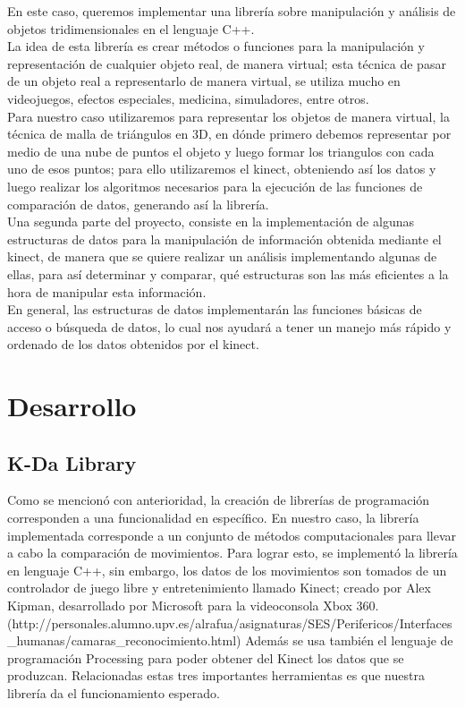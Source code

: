 \documentclass[letterpaper]{article}
\begin{document}
En este caso, queremos implementar una librería sobre manipulación y análisis de objetos tridimensionales
en el lenguaje C++.\\

La idea  de esta librería es crear métodos o funciones para la manipulación y representación 
de cualquier objeto real, de manera virtual; esta técnica de pasar de un objeto real a representarlo de manera virtual, se utiliza mucho 
en videojuegos, efectos especiales, medicina, simuladores, entre otros.\\

Para nuestro caso utilizaremos para representar los objetos de manera virtual, la técnica de malla de triángulos en 3D, en dónde primero debemos 
representar por medio de una nube de puntos el objeto y luego formar los triangulos con cada uno de esos puntos; para ello utilizaremos el kinect, 
obteniendo así los datos y luego realizar los algoritmos necesarios para la ejecución de las funciones de comparación de datos, generando así la librería.\\


Una segunda parte del proyecto, consiste en la implementación de algunas estructuras de datos para la manipulación de información obtenida mediante el kinect, de manera que se quiere realizar un análisis implementando algunas de ellas, para así determinar y comparar, qué estructuras son las más eficientes a la hora de manipular esta información.\\

En general, las estructuras de datos implementarán las funciones básicas de acceso o búsqueda de datos, lo cual nos ayudará a tener un manejo más rápido y ordenado de los datos obtenidos por el kinect.

 

\section{Desarrollo}

\subsection{K-Da Library}

Como se mencionó con anterioridad, la creación de librerías de programación corresponden a una funcionalidad en específico. En nuestro caso, la librería
implementada corresponde a un conjunto de métodos computacionales para llevar a cabo la comparación de movimientos. Para lograr esto, se implementó 
la librería en lenguaje C++, sin embargo, los datos de los movimientos son tomados de un controlador de juego libre y entretenimiento llamado Kinect; creado por Alex Kipman, desarrollado por Microsoft para la videoconsola Xbox 360.(http://personales.alumno.upv.es/alrafua/asignaturas/SES/Perifericos/Interfaces_humanas/camaras_reconocimiento.html)
Además se usa también el lenguaje de programación Processing para poder obtener del Kinect los datos que se produzcan. Relacionadas estas tres importantes
herramientas es que nuestra librería da el funcionamiento esperado. 
\end{document}
